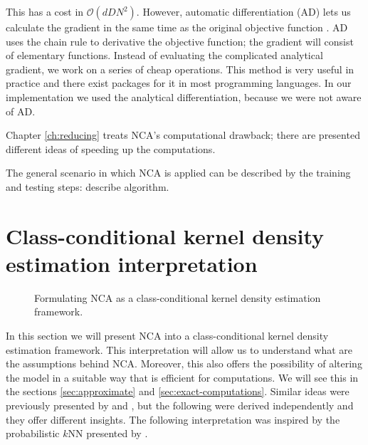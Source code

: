 	This has a cost in $\mathcal{O}(dDN^2)$. However, automatic differentiation (AD) lets us calculate the gradient in the same time as the original objective function \citep{rall1981}. AD uses the chain rule to derivative the objective function; the gradient will consist of elementary functions. Instead of evaluating the complicated analytical gradient, we work on a series of cheap operations. This method is very useful in practice and there exist packages for it in most programming languages. In our implementation we used the analytical differentiation, because we were not aware of AD.

	Chapter \ref{ch:reducing} treats NCA's computational drawback; there are presented different ideas of speeding up the computations.
	
	The general scenario in which NCA is applied can be described by the training and testing steps:
	describe algorithm.
	
\section{Class-conditional kernel density estimation interpretation}
\label{sec:cc-kde}
	
	\begin{figure}
	  \centering
	  \caption{Formulating NCA as a class-conditional kernel density estimation
	framework.}
	  \label{fig:kde}
	\end{figure}
	
	In this section we will present NCA into a class-conditional kernel density
	estimation framework. This interpretation will allow us to understand what are
	the assumptions behind NCA. Moreover, this also offers the possibility of
	altering the model in a suitable way that is efficient for computations. We will
	see this in the sections \ref{sec:approximate} and \ref{sec:exact-computations}.
	Similar ideas were previously presented by and , but the following were derived
	independently and they offer different insights. The following interpretation
	was inspired by the probabilistic $k$NN presented by \citet{barber2011}.
	
